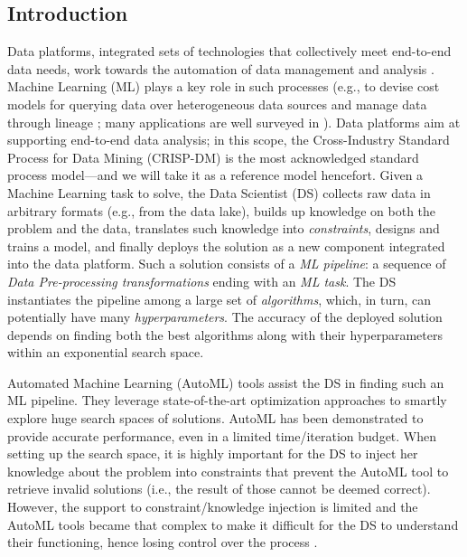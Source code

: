 \subsection{Introduction}\label{intro}
Data platforms, integrated sets of technologies that collectively meet end-to-end data needs, work towards the automation of data management and analysis \cite{DBLP:journals/fgcs/FranciaGGLRS21}.
Machine Learning (ML) plays a key role in such processes (e.g., to devise cost models for querying data over heterogeneous data sources \cite{multi-store} and manage data through lineage \cite{dataplat2}; many applications are well surveyed in \cite{zhou2017ml}).
Data platforms aim at supporting end-to-end data analysis; in this scope, the Cross-Industry Standard Process for Data Mining (CRISP-DM) \cite{wirth2000crisp} is the most acknowledged standard process model---and we will take it as a reference model hencefort.
Given a Machine Learning task to solve, the Data Scientist (DS) collects raw data in arbitrary formats (e.g., from the data lake), builds up knowledge on both the problem and the data, translates such knowledge into \emph{constraints}, designs and trains a model, and finally deploys the solution as a new component integrated into the data platform.
Such a solution consists of a \emph{ML pipeline}: a sequence of \emph{Data Pre-processing transformations} ending with an \emph{ML task}.
The DS instantiates the pipeline among a large set of \emph{algorithms}, which, in turn, can potentially have many \emph{hyperparameters}.
The accuracy of the deployed solution depends on finding both the best algorithms along with their hyperparameters within an exponential search space.

Automated Machine Learning (AutoML) tools assist the DS in finding such an ML pipeline.
They leverage state-of-the-art optimization approaches to smartly explore huge search spaces of solutions.
AutoML has been demonstrated to provide accurate performance, even in a limited time/iteration budget.
When setting up the search space, it is highly important for the DS to inject her knowledge about the problem into constraints that prevent the AutoML tool to retrieve invalid solutions (i.e., the result of those cannot be deemed correct).
However, the support to constraint/knowledge injection is limited and the AutoML tools became that complex to make it difficult for the DS to understand their functioning, hence losing control over the process \cite{XinWLSP21automationml}.

